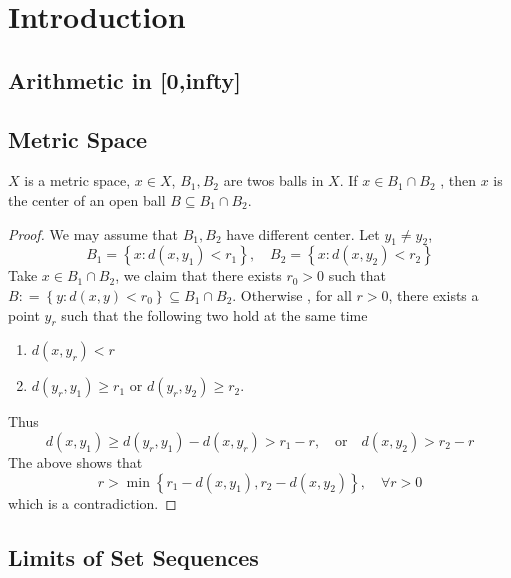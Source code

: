 \documentclass[../main.tex]{subfiles}
\begin{document}
\chapter{Introduction }
\section{Arithmetic in   [0,infty]    } 
\section{Metric Space}
\begin{lemma}{}{}
    \(  X  \) is a metric space, \(  x \in X  \), \(  B_1,B_2  \) are twos balls in \(  X  \). If \(  x  \in B_1\cap B_2  \) , then \(  x  \) is the center of an open ball \(  B\subseteq  B_1\cap B_2  \).       
\end{lemma}
\begin{proof}
    We may assume that \(  B_1,B_2  \) have  different center. Let  \(  y_1\neq y_2  \), \[
B_1= \left\{ x: d\left( x,y_1 \right)< r_1  \right\},\quad B_2= \left\{ x:d\left( x,y_2 \right)< r_2  \right\}
\] 
Take  \(  x \in B_1\cap B_2  \), we claim that there exists  \(  r_0> 0  \) such that  \(  B: =  \left\{ y: d\left( x,y \right)< r_0  \right\}\subseteq B_1\cap B_2  \). Otherwise , for all \(  r > 0 \),  there exists a point \(  y_{r}  \) such that   the following two hold at the same time \begin{enumerate}
    \item \(  d\left( x,y_{r} \right)< r   \)
    \item \(  d\left( y_{r},y_1 \right)\ge r_1   \) or \(  d\left( y_{r},y_2 \right)\ge r_2   \).   
\end{enumerate}
Thus \[
d\left( x,y_1 \right)\ge d\left( y_{r},y_1 \right)-d\left( x,y_{r} \right)>  r_1-r   ,\quad  \text{or} \quad  d\left( x,y_2 \right)> r_2-r 
\] The above shows that \[
r> \min \left\{ r_1-d\left( x,y_1 \right),r_2-d\left( x,y_2 \right)   \right\},\quad \forall r> 0
\] which is a contradiction.
\end{proof}

\section{Limits of Set Sequences}
\end{document}
